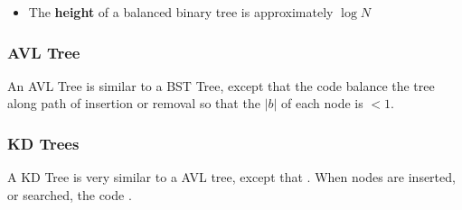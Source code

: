     \begin{itemize}
      \item The \textbf{height} of a balanced binary tree is approximately
      $ \log N $
    \end{itemize}

  \subsubsection{AVL Tree}

    \begin{definition}
      An AVL Tree is similar to a BST Tree, except that the
       code balance the tree along path of
      insertion or removal so that the $ \left| b \right| $ of each node
      is $ < 1 $.
    \end{definition}

  \subsubsection{KD Trees}

    \begin{definition}
      A KD Tree is very similar to a AVL tree, except that
      . When nodes
      are inserted, or searched, the code
      .
    \end{definition}
